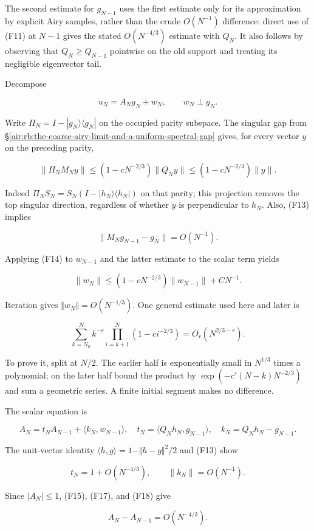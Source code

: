 \documentclass[11pt,letterpaper]{article}
\numberwithin{equation}{section}
\theoremstyle{remark}
\begin{document}
The second estimate for \(g_{N-1}\) uses the first estimate only for its approximation by explicit Airy samples, rather than the crude \(O(N^{-1})\) difference: direct use of (F11) at \(N-1\) gives the stated \(O(N^{-4/3})\) estimate with \(Q_N\). It also follows by observing that \(Q_N\ge Q_{N-1}\) pointwise on the old support and treating its negligible eigenvector tail.

Decompose

\[
u_N=A_Ng_N+w_N,\qquad w_N\perp g_N.
\]

Write \(\Pi _N=I-|g_N\rangle \langle g_N|\) on the occupied parity subspace. The singular gap from \S\ref{air:rb:the-coarse-airy-limit-and-a-uniform-spectral-gap} gives, for every vector \(y\) on the preceding parity,

\[
\|\Pi_NM_Ny\|
\le (1-cN^{-2/3})\|Q_Ny\|
\le (1-cN^{-2/3})\|y\|.
\tag{F14}
\]

Indeed \(\Pi _NS_N=S_N(I-|h_N\rangle \langle h_N|)\) on that parity; this projection removes the top singular direction, regardless of whether \(y\) is perpendicular to \(h_N\). Also, (F13) implies

\[
\|M_Ng_{N-1}-g_N\|=O(N^{-1}).
\]

Applying (F14) to \(w_{N-1}\) and the latter estimate to the scalar term yields

\[
\|w_N\|\le (1-cN^{-2/3})\|w_{N-1}\|+CN^{-1}.
\tag{F15}
\]

Iteration gives \(\Vert w_N\Vert =O(N^{-1/3})\). One general estimate used here and later is

\[
\sum_{k=N_0}^N k^{-r}
\prod_{i=k+1}^N(1-ci^{-2/3})=O_r(N^{2/3-r}).
\tag{F16}
\]

To prove it, split at \(N/2\). The earlier half is exponentially small in \(N^{1/3}\) times a polynomial; on the later half bound the product by \(\exp(-c'(N-k)N^{-2/3})\) and sum a geometric series. A finite initial segment makes no difference.

The scalar equation is

\[
A_N=t_NA_{N-1}+\langle k_N,w_{N-1}\rangle,
\quad
t_N=\langle Q_Nh_N,g_{N-1}\rangle,
\quad k_N=Q_Nh_N-g_{N-1}.
\tag{F17}
\]

The unit-vector identity \(\langle h,g\rangle =1-\Vert h-g\Vert ^2/2\) and (F13) show

\[
t_N=1+O(N^{-4/3}),\qquad \|k_N\|=O(N^{-1}).
\tag{F18}
\]

Since \(|A_N|\le 1\), (F15), (F17), and (F18) give

\[
A_N-A_{N-1}=O(N^{-4/3}).
\]
\end{document}
